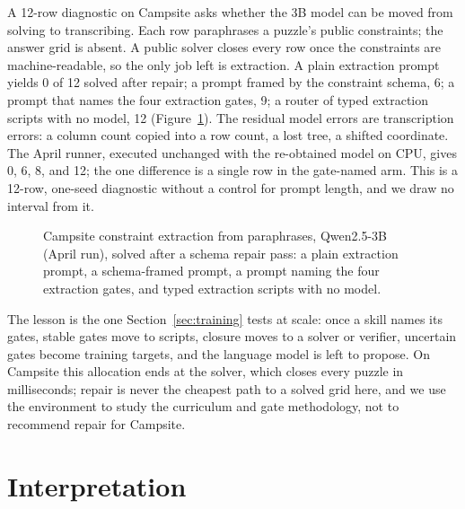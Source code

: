 \documentclass[11pt]{article}
\begin{document}
A 12-row diagnostic on Campsite asks whether the 3B model can be moved from solving to transcribing. Each row paraphrases a puzzle's public constraints; the answer grid is absent. A public solver closes every row once the constraints are machine-readable, so the only job left is extraction. A plain extraction prompt yields 0 of 12 solved after repair; a prompt framed by the constraint schema, 6; a prompt that names the four extraction gates, 9; a router of typed extraction scripts with no model, 12 (Figure~\ref{fig:campgate}). The residual model errors are transcription errors: a column count copied into a row count, a lost tree, a shifted coordinate. The April runner, executed unchanged with the re-obtained model on CPU, gives 0, 6, 8, and 12; the one difference is a single row in the gate-named arm. This is a 12-row, one-seed diagnostic without a control for prompt length, and we draw no interval from it.

\begin{figure}[t]
  \centering
  \caption{Campsite constraint extraction from paraphrases, Qwen2.5-3B (April run), solved after a schema repair pass: a plain extraction prompt, a schema-framed prompt, a prompt naming the four extraction gates, and typed extraction scripts with no model.}
  \label{fig:campgate}
\end{figure}

The lesson is the one Section~\ref{sec:training} tests at scale: once a skill names its gates, stable gates move to scripts, closure moves to a solver or verifier, uncertain gates become training targets, and the language model is left to propose. On Campsite this allocation ends at the solver, which closes every puzzle in milliseconds; repair is never the cheapest path to a solved grid here, and we use the environment to study the curriculum and gate methodology, not to recommend repair for Campsite.

\section{Interpretation}
\label{sec:interpretation}
\end{document}
